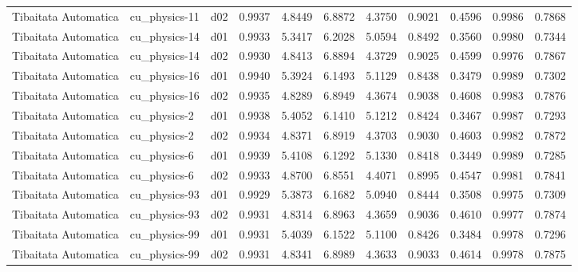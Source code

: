 \begin{longtable}{lllrrrrrrrr}
 Tibaitata Automatica  &         cu\_physics-11 &     d02 &   0.9937 &   4.8449 &   6.8872 &       4.3750 &        0.9021 &       0.4596 &           0.9986 &  0.7868 \\
 Tibaitata Automatica  &         cu\_physics-14 &     d01 &   0.9933 &   5.3417 &   6.2028 &       5.0594 &        0.8492 &       0.3560 &           0.9980 &  0.7344 \\
 Tibaitata Automatica  &         cu\_physics-14 &     d02 &   0.9930 &   4.8413 &   6.8894 &       4.3729 &        0.9025 &       0.4599 &           0.9976 &  0.7867 \\
 Tibaitata Automatica  &         cu\_physics-16 &     d01 &   0.9940 &   5.3924 &   6.1493 &       5.1129 &        0.8438 &       0.3479 &           0.9989 &  0.7302 \\
 Tibaitata Automatica  &         cu\_physics-16 &     d02 &   0.9935 &   4.8289 &   6.8949 &       4.3674 &        0.9038 &       0.4608 &           0.9983 &  0.7876 \\
 Tibaitata Automatica  &          cu\_physics-2 &     d01 &   0.9938 &   5.4052 &   6.1410 &       5.1212 &        0.8424 &       0.3467 &           0.9987 &  0.7293 \\
 Tibaitata Automatica  &          cu\_physics-2 &     d02 &   0.9934 &   4.8371 &   6.8919 &       4.3703 &        0.9030 &       0.4603 &           0.9982 &  0.7872 \\
 Tibaitata Automatica  &          cu\_physics-6 &     d01 &   0.9939 &   5.4108 &   6.1292 &       5.1330 &        0.8418 &       0.3449 &           0.9989 &  0.7285 \\
 Tibaitata Automatica  &          cu\_physics-6 &     d02 &   0.9933 &   4.8700 &   6.8551 &       4.4071 &        0.8995 &       0.4547 &           0.9981 &  0.7841 \\
 Tibaitata Automatica  &         cu\_physics-93 &     d01 &   0.9929 &   5.3873 &   6.1682 &       5.0940 &        0.8444 &       0.3508 &           0.9975 &  0.7309 \\
 Tibaitata Automatica  &         cu\_physics-93 &     d02 &   0.9931 &   4.8314 &   6.8963 &       4.3659 &        0.9036 &       0.4610 &           0.9977 &  0.7874 \\
 Tibaitata Automatica  &         cu\_physics-99 &     d01 &   0.9931 &   5.4039 &   6.1522 &       5.1100 &        0.8426 &       0.3484 &           0.9978 &  0.7296 \\
 Tibaitata Automatica  &         cu\_physics-99 &     d02 &   0.9931 &   4.8341 &   6.8989 &       4.3633 &        0.9033 &       0.4614 &           0.9978 &  0.7875 \\

\end{longtable}
